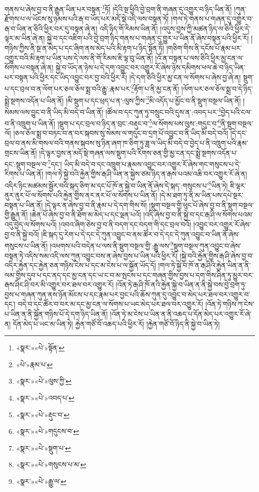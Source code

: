 གནས་པ་ཞེས་བྱ་བ་ནི་རྒྱུན་ཡིན་པར་བསྟན་\footnote{«སྣར་»«པེ་»སྟོན་}ཏོ། །དེའི་སྔ་ཕྱིའི་བྱེ་བྲག་ནི་གཞན་དུ་འགྱུར་བ་ཉིད་ཡིན་ནོ། །ཀུན་རྫོགས་པ་ལ་ཡོངས་སུ་ཉམས་པའི་རྒ་བ་ཡོད་པར་མདོ་སྡེ་འདི་ལས་བསྟན་ཏོ། །གལ་ཏེ་གནས་པ་གཞན་དུ་འགྱུར་བ་རྒ་བ་ཡིན་ན་ཅིའི་ཕྱིར་བར་དུ་བསྟན་ཞེ་ན། འདི་ཉིད་གོ་རིམས་ཡིན་ནོ། །འདུས་བྱས་ཀྱི་མཚན་ཉིད་ལ་ཅིའི་ཕྱིར་དེ་ལྟར་མ་ཡིན་ཞེ་ན། སྐྱེ་བ་དང་འཇིག་པའི་བྱེ་བྲག་ཉིད་གནས་པ་གཞན་དུ་གྱུར་པ་ཡིན་ནོ་ཞེས་བསྟན་པའི་ཕྱིར་རོ། །གཉིས་ཀྱིས་ནི་སྔ་ན་མེད་པ་དང་ཞིག་ནས་མེད་པའི་མི་རྟག་པ་ཉིད་སྟོན་ཏོ། །གཅིག་གིས་ནི་དངོས་པོ་རྣམ་པར་འགྱུར་བའི་མི་རྟག་པ་ཡིན་པས་དེ་ལས་ནི་གོ་རིམས་ཇི་ལྟ་བུ་ཡིན་ནོ། །འོ་ན་བསྟན་པ་ལས་ཅིའི་ཕྱིར་མྱ་ངན་ལ་སོགས་པ་བསྟན་ཞེ་ན། སྐྱེ་བ་ཡོད་ན་ཉེས་པ་དེ་དག་འབྱུང་བར་འགྱུར་རོ་ཞེས་ཉེས་དམིགས་ཕལ་ཆེ་བ་ཉིད་ཡིན་པར་བསྟན་པའི་ཕྱིར་དང་ཡིད་འབྱུང་བར་བྱ་བའི་ཕྱིར་རོ། །དེ་དག་ཅིའི་ཕྱིར་མྱ་ངན་ལ་སོགས་པ་ཞེས་བྱ་ཞེ་ན། སྡུག་པ་དང་བྲལ་བ་ན་ལོག་པར་ཅལ་ཅོལ་སྨྲ་བའི་རྒྱུ་:རྣམ་པར་\footnote{«པེ་»རྣམ་པ་}རྟོག་པ་ནི་མྱ་ངན་ནོ། །ལོག་པར་ཅལ་ཅོལ་སྨྲ་བ་དེ་ཉིད་སྨྲེ་སྔགས་འདོན་པ་ཡིན་ནོ། །མི་སྡུག་པ་དང་ཕྲད་པ་ན་:ལུས་ཀྱིས་\footnote{«སྣར་»«པེ་»ལུས་ཀྱི་}མི་འདོད་པ་མྱོང་བ་ནི་སྡུག་བསྔལ་ཡིན་ནོ། །སེམས་ལས་བྱུང་བ་ནི་ཡིད་མི་བདེ་བ་ཡིན་ནོ། །ཚོལ་བ་དང་ཀུན་ཏུ་བསྲུང་བའི་དུས་ན་:འབད་པར་\footnote{«སྣར་»«པེ་»འབད་པ་}བྱེད་པའི་ངལ་བ་ནི་འཁྲུག་པ་ཡིན་ནོ། །སྡུག་པ་དང་བྲལ་བ་ཉིད་ན་བྲང་:བརྡུང་བ་\footnote{«སྣར་»«པེ་»རྡུང་བ་}ལ་སོགས་པས་ལུས་:གདུང་བ་\footnote{«སྣར་»«པེ་»གདུངས་བ་}ནི་སྡུག་བསྔལ་ལོ། །ཅལ་ཅོལ་སྨྲ་བ་བཏང་བ་ན་བར་སྐབས་སུ་སེམས་ལ་གདུང་བ་དྲག་པོ་འབྱུང་བ་ནི་ཡིད་མི་བདེ་བའོ། །དེ་དང་བྲལ་བ་ནས་མི་གསལ་བའི་གནས་སྐབས་སུ་ཉིན་ཞག་ཁ་ཅིག་ཏུ་ཟླ་ལ་ཡིད་མི་བདེ་བ་བྱེད་པ་ནི་འཁྲུག་པའི་རྣམ་གྲངས་ཡིན་ནོ། །དེ་ལྟར་བྱས་ན་མདོ་སྡེ་གཞན་ལས་སྡུག་པའི་རིགས་ཅན་གྱི་མྱ་ངན་དང་སྨྲེ་སྔགས་འདོན་པ་དང་:སྡུག་བསྔལ་བ་\footnote{«སྣར་»«པེ་»སྡུག་པ་}དང་། ཡིད་མི་བདེ་བ་དང་འཁྲུག་པ་རྣམས་འབྱུང་བར་འགྱུར་རོ་ཞེས་གང་གསུངས་པ་དེ་རིགས་པ་ཡིན་ནོ། །གལ་ཏེ་སྐྱེ་བའི་རྐྱེན་གྱིས་རྒ་ཤི་ཡིན་ན་སྐྱེས་ཙམ་ཉིད་ན་རྒས་པའམ་འཆི་བར་འགྱུར་རོ་ཞེ་ན། འདིར་ཉིང་མཚམས་སྦྱོར་བའི་སྐད་ཅིག་མ་དང་པོ་ཁོ་ན་སྐྱེ་བ་ཡིན་ནོ་ཞེས་དེ་སྐད་:གསུངས་པ་\footnote{«སྣར་»«པེ་»གསུངས་པ་མ་}ཡིན་ཏེ། ཇི་ལྟར་ནུར་ནུར་པོ་ལ་སོགས་པའི་རྐྱེན་གྱིས་ནར་ནར་པོ་ལ་སོགས་པ་ཡིན་ནོ། །དེ་མ་ཐག་ཏུ་ནི་མ་ཡིན་པས་དཔེ་སྔར་བསྟན་པ་ཡིན་ནོ། །དེ་ལྟར་ན་ཞེས་བྱ་བ་ནི་རྣམ་པ་དེ་དག་གིས་སོ། །སྡུག་བསྔལ་གྱི་ཕུང་པོ་ཞེས་བྱ་བ་ནི་སྡུག་བསྔལ་གྱི་རྒྱུན་ནོ། །ཆེན་པོ་ཞེས་བྱ་བ་ནི་ཐོག་མ་མེད་པ་དང་ལྡན་པའོ། །འདི་ཞེས་བྱ་བ་ནི་སྐྱེ་བ་དང་རྒ་ཤི་ལ་སོགས་པའམ་འདུ་བྱེད་ལ་སོགས་པའོ། །འབའ་ཞིག་ཅེས་བྱ་བ་ནི་བདག་དང་བདག་གི་དང་བྲལ་བའོ། །འབྱུང་བར་འགྱུར་རོ་ཞེས་བྱ་བ་ནི་སྐྱེ་བའོ། །ཇི་སྐད་དུ་རེག་པ་དེ་དང་དེ་ཀུན་འབྱུང་བ་ནས་ཚོར་བ་དེ་དང་དེ་ཀུན་འབྱུང་བ་ཡིན་ནོ་ཞེས་གསུངས་པ་ཡིན་ནོ། །འཕགས་པའི་བདེན་པ་ལས་ནི་སྡུག་བསྔལ་གྱི་:རྒྱུ་ལས་\footnote{«སྣར་»«པེ་»རྒྱུ་ལ་}སྡུག་བསྔལ་ཀུན་འབྱུང་བ་ཞེས་བསྟན་ཏེ་འདིས་སམ་འདི་ལས་ཀུན་འབྱུང་བས་ན་ཞེས་བྱས་པ་ཡིན་པའི་ཕྱིར་རོ། །སྐྱེ་བའི་རྐྱེན་གྱིས་རྒ་ཤི་ཞེས་བྱ་བ་འདིར་རྐྱེན་དང་རྐྱེན་ཅན་གཉིས་ངེས་པ་དང་མ་ངེས་པ་ལ་སྐྱོན་ཡོད་དོ། །གལ་ཏེ་སྐྱེ་བ་ཁོ་ན་རྒ་ཤིའི་རྐྱེན་ཡིན་ན་ནི་ལམ་གྱིས་དུབ་པ་དང་ནད་དང་མྱ་ངན་དང་ཡ་ང་བ་མ་སྤངས་པ་དང་གཞན་གྱིས་བྱས་པ་དག་གིས་ཤིན་ཏུ་མྱུར་བར་རྒས་ཤིང་ཤི་བར་མི་འགྱུར་བར་ཐལ་བར་འགྱུར་རོ། །འོན་ཏེ་རྒ་ཤི་ཁོ་ནའི་རྐྱེན་སྐྱེ་བ་ཡིན་ན་ནི་སྐྱེ་བས་བྱེ་བྲག་ཏུ་བྱས་པ་གཞན་ཀུན་ནས་ཉོན་མོངས་པ་དང་རྣམ་པར་བྱང་པའི་ཆོས་ཀུན་དུ་འབྱུང་བ་མེད་པར་ཐལ་བར་འགྱུར་བ་དང་། བདེ་བ་དང་ཚོར་བ་བར་མ་དང་མྱ་ངན་ལ་སོགས་པ་ཡང་མེད་པར་ཐལ་བར་འགྱུར་རོ། །འོན་ཏེ་གཉིས་ཀ་ངེས་པ་ཡིན་ན་ནི་སྐྱོན་གཉིས་པོ་དེ་དག་ཉིད་ཡིན་ནོ། །འོན་ཏེ་མ་ངེས་པ་ཡིན་ན་ནི་འཆད་པ་དོན་མེད་པར་འགྱུར་རོ་ཞེ་ན། དོན་མེད་པ་ཡང་མ་ཡིན་ཏེ། རྐྱེན་གཙོ་བོ་འཆད་པའི་ཕྱིར་རོ། །རྐྱེན་གཙོ་བོ་ཉིད་ནི་སྐྱེ་བ་ཡིན་ཏེ། 